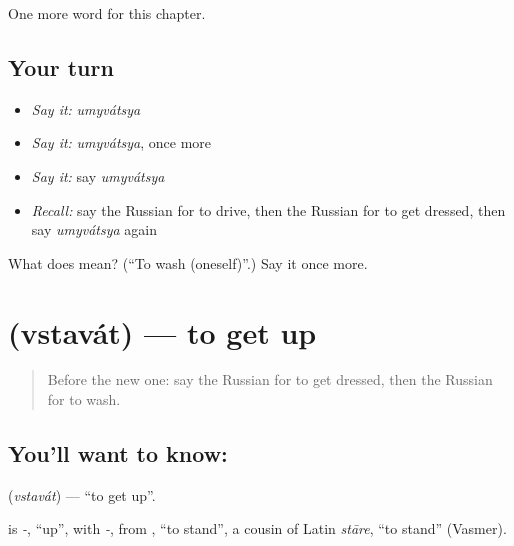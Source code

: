 \begin{grammarlens}[title={What you've built}]
One more word for this chapter.
\end{grammarlens}

\subsection*{Your turn}
\begin{itemize}
\raggedright
  \item \emph{Say it:} \emph{umyvátsya}
  \item \emph{Say it:} \emph{umyvátsya}, once more
  \item \emph{Say it:} say \emph{umyvátsya}
  \item \emph{Recall:} say the Russian for to drive, then the Russian for to get dressed, then say \emph{umyvátsya} again
\end{itemize}

\begin{tcolorbox}[breakable,colback=teal!4,colframe=teal!35!black,title={Before you move on}]
What does  mean? (\textquotedblleft{}To wash (oneself)\textquotedblright{}.) Say it once more.
\end{tcolorbox}
\section[\texorpdfstring{\ru{вставать} (vstavát)}{вставать (vstavát)}]{ (vstavát) — to get up}

\label{lesson:RU-C132-to-get-up}



\begin{quote}
Before the new one: say the Russian for to get dressed, then the Russian for to wash.
\end{quote}

\subsection*{You'll want to know: }
\textbf{} (\emph{vstavát}) — \textquotedblleft{}to get up\textquotedblright{}.

\begin{cousinweb}
\textbf{} is \emph{-}, \textquotedblleft{}up\textquotedblright{}, with \emph{-}, from \emph{}, \textquotedblleft{}to stand\textquotedblright{}, a cousin of Latin \emph{stāre}, \textquotedblleft{}to stand\textquotedblright{} (Vasmer).
\end{cousinweb}

